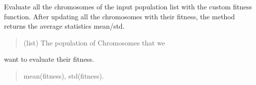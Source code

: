 \documentclass[letterpaper,10pt,english]{sphinxmanual}
\begin{document}
\begin{fulllineitems}
\begin{fulllineitems}
\label{\detokenize{pygenalgo.engines:pygenalgo.engines.island_model_ga.IslandModelGA.evaluate_fitness}}
\pysigstartsignatures
{}
\pysigstopsignatures
\sphinxAtStartPar
Evaluate all the chromosomes of the input population list with the
custom fitness  function. After updating all  the chromosomes with
their fitness, the method returns the average statistics mean/std.
\begin{quote}\begin{description}
\sphinxAtStartPar
{} \textendash{} (list) The population of Chromosomes that we

\end{description}\end{quote}

\sphinxAtStartPar
want to evaluate their fitness.
\begin{quote}\begin{description}
\sphinxAtStartPar
mean(fitness), std(fitness).

\end{description}\end{quote}

\end{fulllineitems}



\end{fulllineitems}
\end{document}
